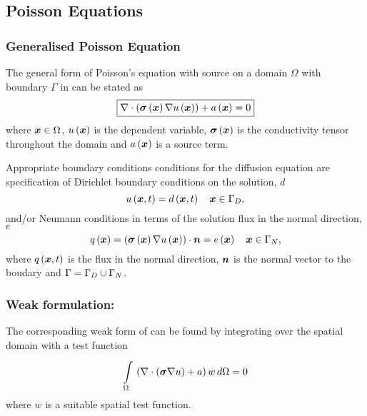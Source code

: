 \subsection{Poisson Equations} 

\subsubsection{Generalised Poisson Equation} 


The general form of Poisson's equation with source on a domain $\Omega$ with boundary
$\Gamma$ in \OpenCMISS can be stated as
\begin{equation}
  \boxed{
    \divergence{}{\pbrac{\fnof{\tensor{\sigma}}{\vect{x}}\gradient{}{\fnof{u}{\vect{x}}}}}+
    \fnof{a}{\vect{x}}=0
  }
  \label{eqn:Poissonequation}
\end{equation}
where $\vect{x}\in\Omega$, $\fnof{u}{\vect{x}}$ is the dependent variable, 
$\fnof{\tensor{\sigma}}{\vect{x}}$ is the conductivity tensor throughout 
the domain and $\fnof{a}{\vect{x}}$ is a source term.

Appropriate boundary conditions conditions for the diffusion
equation are specification of Dirichlet boundary conditions on the solution,
$d$ \ie
\begin{equation}
  \fnof{u}{\vect{x},t} = \fnof{d}{\vect{x},t} \quad \vect{x}\in\Gamma_{D},
  \label{eqn:PoissonDirichletBC} 
\end{equation}
and/or Neumann conditions in terms of the solution flux in the normal
direction, $e$ \ie
\begin{equation}
  \fnof{q}{\vect{x}} = \dotprod{\pbrac{\fnof{\tensor{\sigma}}{\vect{x}}
      \gradient{}{\fnof{u}{\vect{x}}}}}{\normal} =
  \fnof{e}{\vect{x}} \quad \vect{x}\in\Gamma_{N},
  \label{eqn:PoissonNeumannBC} 
\end{equation}
where $\fnof{q}{\vect{x},t}$ is the flux in the normal direction, $\boldsymbol{n}$ is the normal
vector to the boudary and $\Gamma=\Gamma_{D}\cup\Gamma_{N}$.

\subsubsection{Weak formulation:}

The corresponding weak form of  can be found by
integrating over the spatial domain with a test function \ie
\begin{equation}
  \gint{\Omega}{}{\pbrac{\divergence{}{\pbrac{\tensor{\sigma}\gradient{}{u}}}+a}w}{\Omega}=0
  \label{eqn:Poissonweakform1}
\end{equation}
where $w$ is a suitable spatial test function.

